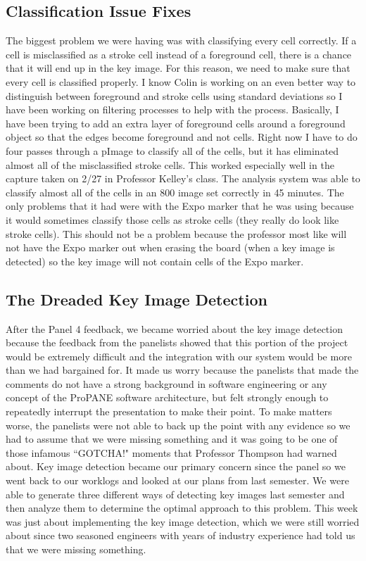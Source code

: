 \documentclass[]{article}
\begin{document}
		\subsection{Classification Issue Fixes}
			The biggest problem we were having was with classifying every cell correctly. If a cell is misclassified as a stroke cell instead of a foreground cell, there is a chance that it will end up in the key image. For this reason, we need to make sure that every cell is classified properly. I know Colin is working on an even better way to distinguish between foreground and stroke cells using standard deviations so I have been working on filtering processes to help with the process. Basically, I have been trying to add an extra layer of foreground cells around a foreground object so that the edges become foreground and not cells. Right now I have to do four passes through a pImage to classify all of the cells, but it has eliminated almost all of the misclassified stroke cells. This worked especially well in the capture taken on 2/27 in Professor Kelley's class. The analysis system was able to classify almost all of the cells in an 800 image set correctly in 45 minutes. The only problems that it had were with the Expo marker that he was using because it would sometimes classify those cells as stroke cells (they really do look like stroke cells). This should not be a problem because the professor most like will not have the Expo marker out when erasing the board (when a key image is detected) so the key image will not contain cells of the Expo marker.
			
		\subsection{The Dreaded Key Image Detection}
			After the Panel 4 feedback, we became worried about the key image detection because the feedback from the panelists showed that this portion of the project would be extremely difficult and the integration with our system would be more than we had bargained for. It made us worry because the panelists that made the comments do not have a strong background in software engineering or any concept of the ProPANE software architecture, but felt strongly enough to repeatedly interrupt the presentation to make their point. To make matters worse, the panelists were not able to back up the point with any evidence so we had to assume that we were missing something and it was going to be one of those infamous ``GOTCHA!" moments that Professor Thompson had warned about. Key image detection became our primary concern since the panel so we went back to our worklogs and looked at our plans from last semester. We were able to generate three different ways of detecting key images last semester and then analyze them to determine the optimal approach to this problem. This week was just about implementing the key image detection, which we were still worried about since two seasoned engineers with years of industry experience had told us that we were missing something. 
			
\end{document}
